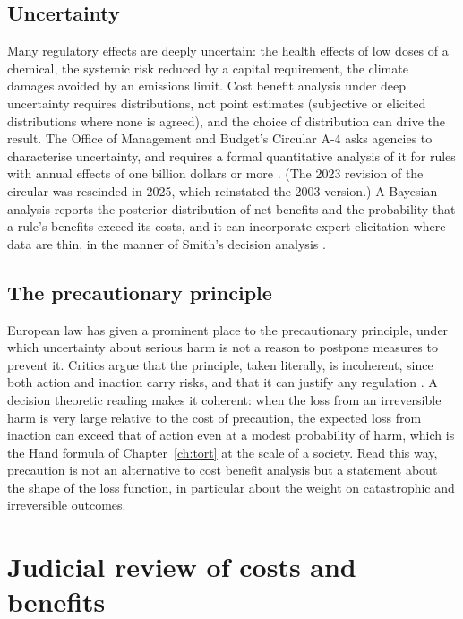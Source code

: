 \subsection{Uncertainty}

Many regulatory effects are deeply uncertain: the health effects of low doses of a chemical, the systemic risk reduced by a capital requirement, the climate damages avoided by an emissions limit. Cost benefit analysis under deep uncertainty requires distributions, not point estimates (subjective or elicited distributions where none is agreed), and the choice of distribution can drive the result. The Office of Management and Budget's Circular A-4 asks agencies to characterise uncertainty, and requires a formal quantitative analysis of it for rules with annual effects of one billion dollars or more \citep{omb2003a4}. (The 2023 revision of the circular was rescinded in 2025, which reinstated the 2003 version.) A Bayesian analysis reports the posterior distribution of net benefits and the probability that a rule's benefits exceed its costs, and it can incorporate expert elicitation where data are thin, in the manner of Smith's decision analysis \citep{smith2010}.

\subsection{The precautionary principle}

European law has given a prominent place to the precautionary principle, under which uncertainty about serious harm is not a reason to postpone measures to prevent it. Critics argue that the principle, taken literally, is incoherent, since both action and inaction carry risks, and that it can justify any regulation \citep{sunstein2005}. A decision theoretic reading makes it coherent: when the loss from an irreversible harm is very large relative to the cost of precaution, the expected loss from inaction can exceed that of action even at a modest probability of harm, which is the Hand formula of Chapter~\ref{ch:tort} at the scale of a society. Read this way, precaution is not an alternative to cost benefit analysis but a statement about the shape of the loss function, in particular about the weight on catastrophic and irreversible outcomes.

\section{Judicial review of costs and benefits}

